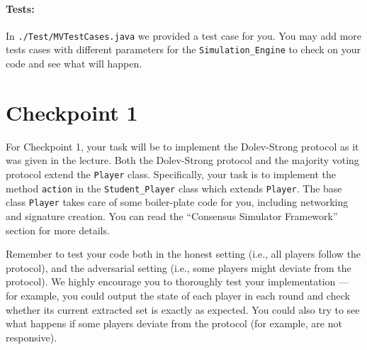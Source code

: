 \paragraph{Tests:}
In {\tt ./Test/MVTestCases.java} we provided a test case for you. You may add more tests cases with different parameters for the {\tt Simulation\_Engine} to check on your code and see what will happen.

\section{Checkpoint 1}
\label{sec:cp1}
For Checkpoint 1, your task will be to implement the Dolev-Strong protocol as it was given in the lecture. Both the Dolev-Strong protocol and the majority voting protocol extend the \texttt{Player} class.
Specifically,
your task is to implement the method \texttt{action} in the \texttt{Student\_Player} class
which extends {\tt Player}.
The base class {\tt Player} takes care of some boiler-plate code for you, including
networking and signature creation. You can read the ``Consensus Simulator Framework''
section for more details.

Remember to test your code both in the honest setting (i.e., all players follow the protocol), and the adversarial setting (i.e., some players might deviate from the protocol). We highly encourage you to thoroughly test your implementation --- for example, you could output the state of each player in each round and check whether its current extracted set is exactly as expected. You could also try to see what happens if some players deviate from the protocol (for example, are not responsive).

